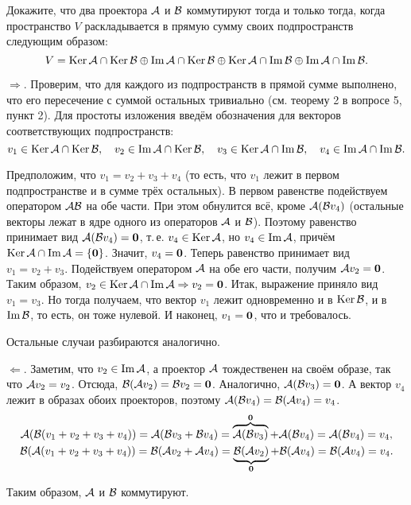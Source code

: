 \begin{problem}[А.\,А. Клячко]
    Докажите, что два проектора $\mathcal{A}$ и $\mathcal{B}$ коммутируют тогда и только тогда, когда пространство $V$ раскладывается в прямую сумму своих подпространств следующим образом:
    \[
        V = \operatorname{Ker}\mathcal{A} \cap \operatorname{Ker}\mathcal{B} \oplus \operatorname{Im}\mathcal{A} \cap \operatorname{Ker}\mathcal{B} \oplus \operatorname{Ker}\mathcal{A} \cap \operatorname{Im}\mathcal{B} \oplus \operatorname{Im}\mathcal{A} \cap \operatorname{Im}\mathcal{B}.
    \]
\end{problem}

\begin{solution}
    $\Rightarrow$. Проверим, что для каждого из подпространств в прямой сумме выполнено, что его пересечение с суммой остальных тривиально (см. теорему 2 в вопросе 5, пункт 2). Для простоты изложения введём обозначения для векторов соответствующих подпространств:
    \[
        v_1 \in \operatorname{Ker}\mathcal{A} \cap \operatorname{Ker}\mathcal{B},\quad v_2 \in \operatorname{Im}\mathcal{A} \cap \operatorname{Ker}\mathcal{B},\quad v_3 \in \operatorname{Ker}\mathcal{A} \cap \operatorname{Im}\mathcal{B},\quad v_4 \in \operatorname{Im}\mathcal{A} \cap \operatorname{Im}\mathcal{B}.
    \]

    Предположим, что $v_1 = v_2 + v_3 + v_4$ (то есть, что $v_1$ лежит в первом подпространстве и в сумме трёх остальных). В первом равенстве подействуем оператором $\mathcal{A}\mathcal{B}$ на обе части. При этом обнулится всё, кроме $\mathcal{A}(\mathcal{B} v_4)$ (остальные векторы лежат в ядре одного из операторов $\mathcal{A}$ и $\mathcal{B}$). Поэтому равенство принимает вид $\mathcal{A}(\mathcal{B} v_4) = \boldsymbol{0}$, т.\,е. $v_4 \in \operatorname{Ker}\mathcal{A}$, но $v_4 \in \operatorname{Im}\mathcal{A}$, причём $\operatorname{Ker}\mathcal{A} \cap \operatorname{Im}\mathcal{A} = \{\boldsymbol{0}\}$. Значит, $v_4 = \boldsymbol{0}$. Теперь равенство принимает вид $v_1 = v_2 + v_3$. Подействуем оператором $\mathcal{A}$ на обе его части, получим $\mathcal{A} v_2 = \boldsymbol{0}$. Таким образом, $v_2 \in \operatorname{Ker}\mathcal{A} \cap \operatorname{Im}\mathcal{A} \Rightarrow v_2 = \boldsymbol{0}$. Итак, выражение приняло вид $v_1 = v_3$. Но тогда получаем, что вектор $v_1$ лежит одновременно и в $\operatorname{Ker}\mathcal{B}$, и в $\operatorname{Im}\mathcal{B}$, то есть, он тоже нулевой. И наконец, $v_1 = \boldsymbol{0}$, что и требовалось.

    Остальные случаи разбираются аналогично.

    $\Leftarrow$. Заметим, что $v_2 \in \operatorname{Im}\mathcal{A}$, а проектор $\mathcal{A}$ тождественен на своём образе, так что $\mathcal{A} v_2 = v_2$. Отсюда, $\mathcal{B}(\mathcal{A} v_2) = \mathcal{B} v_2 = \boldsymbol{0}$. Аналогично, $\mathcal{A}(\mathcal{B} v_3) = \boldsymbol{0}$. А вектор $v_4$ лежит в образах обоих проекторов, поэтому $\mathcal{A}(\mathcal{B} v_4) = \mathcal{B}(\mathcal{A} v_4) = v_4$.
    \begin{gather*}
        \mathcal{A}(\mathcal{B}(v_1 + v_2 + v_3 + v_4)) = \mathcal{A}(\mathcal{B} v_3 + \mathcal{B} v_4) = \overbrace{\mathcal{A}(\mathcal{B} v_3)}^{\boldsymbol{0}} + \mathcal{A}(\mathcal{B} v_4) = \mathcal{A}(\mathcal{B} v_4) = v_4,\\ \mathcal{B}(\mathcal{A}(v_1 + v_2 + v_3 + v_4)) = \mathcal{B}(\mathcal{A} v_2 + \mathcal{A} v_4) = \underbrace{\mathcal{B}(\mathcal{A} v_2)}_{\boldsymbol{0}} + \mathcal{B}(\mathcal{A} v_4) = \mathcal{B}(\mathcal{A} v_4) = v_4.
    \end{gather*}

    Таким образом, $\mathcal{A}$ и $\mathcal{B}$ коммутируют.
\end{solution}

